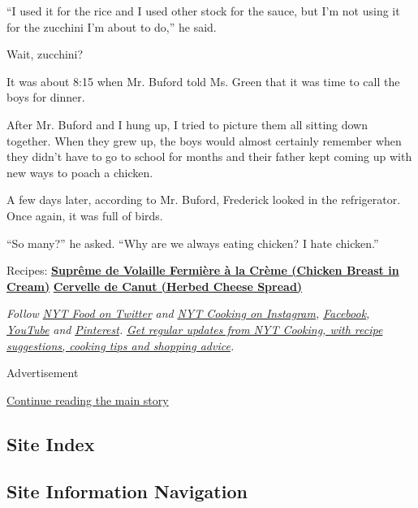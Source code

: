 ``I used it for the rice and I used other stock for the sauce, but I'm
not using it for the zucchini I'm about to do,'' he said.

Wait, zucchini?

It was about 8:15 when Mr. Buford told Ms. Green that it was time to
call the boys for dinner.

After Mr. Buford and I hung up, I tried to picture them all sitting down
together. When they grew up, the boys would almost certainly remember
when they didn't have to go to school for months and their father kept
coming up with new ways to poach a chicken.

A few days later, according to Mr. Buford, Frederick looked in the
refrigerator. Once again, it was full of birds.

``So many?'' he asked. ``Why are we always eating chicken? I hate
chicken.''

Recipes:
\textbf{\href{https://cooking.nytimes.com/recipes/1021177-supreme-de-volaille-fermiere-a-la-creme-chicken-breast-in-cream}{Suprême
de Volaille Fermière à la Crème (Chicken Breast in Cream)}} \textbar{}
\textbf{\href{https://cooking.nytimes.com/recipes/1021178-cervelle-de-canut-herbed-cheese-spread}{Cervelle
de Canut (Herbed Cheese Spread)}}

\emph{Follow} \href{https://twitter.com/nytfood}{\emph{NYT Food on
Twitter}} \emph{and}
\href{https://www.instagram.com/nytcooking/}{\emph{NYT Cooking on
Instagram}}\emph{,}
\href{https://www.facebook.com/nytcooking/}{\emph{Facebook}}\emph{,}
\href{https://www.youtube.com/nytcooking}{\emph{YouTube}} \emph{and}
\href{https://www.pinterest.com/nytcooking/}{\emph{Pinterest}}\emph{.}
\href{https://www.nytimes.com/newsletters/cooking}{\emph{Get regular
updates from NYT Cooking, with recipe suggestions, cooking tips and
shopping advice}}\emph{.}

Advertisement

\protect\hyperlink{after-bottom}{Continue reading the main story}

\hypertarget{site-index}{%
\subsection{Site Index}\label{site-index}}

\hypertarget{site-information-navigation}{%
\subsection{Site Information
Navigation}\label{site-information-navigation}}

